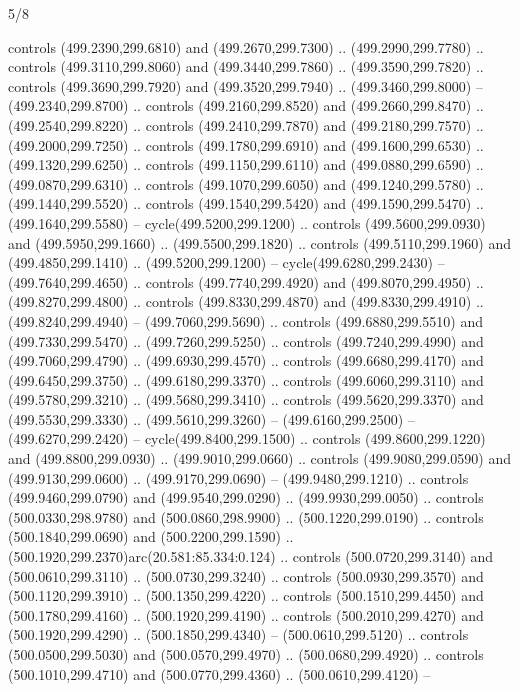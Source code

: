 \begin{flagdescription}{5/8}
\begin{scope}[xshift=0.5\flaglength,yshift=0.5\flagwidth,scale=\flagwidth/475.63]
\begin{scope}[y=0.8pt, x=0.8pt, yscale=-1, xscale=1,shift={(-450,-300)}]
\begin{scope}[cm={{1.0,0.0,0.0,1.0,(-0.0002,0.12556)}},cm={{1.0,0.0,0.0,1.0,(0.00179,0.0)}}]
\begin{scope}[cm={{1.11592,0.0,0.0,1.11592,(-106.89933,-41.77764)}}]
\begin{scope}[draw=black,fill=cfff]
\begin{scope}[fill=black]
  controls (499.2390,299.6810) and (499.2670,299.7300) .. (499.2990,299.7780) ..
  controls (499.3110,299.8060) and (499.3440,299.7860) .. (499.3590,299.7820) ..
  controls (499.3690,299.7920) and (499.3520,299.7940) .. (499.3460,299.8000) --
  (499.2340,299.8700) .. controls (499.2160,299.8520) and (499.2660,299.8470) ..
  (499.2540,299.8220) .. controls (499.2410,299.7870) and (499.2180,299.7570) ..
  (499.2000,299.7250) .. controls (499.1780,299.6910) and (499.1600,299.6530) ..
  (499.1320,299.6250) .. controls (499.1150,299.6110) and (499.0880,299.6590) ..
  (499.0870,299.6310) .. controls (499.1070,299.6050) and (499.1240,299.5780) ..
  (499.1440,299.5520) .. controls (499.1540,299.5420) and (499.1590,299.5470) ..
  (499.1640,299.5580) -- cycle(499.5200,299.1200) .. controls
  (499.5600,299.0930) and (499.5950,299.1660) .. (499.5500,299.1820) .. controls
  (499.5110,299.1960) and (499.4850,299.1410) .. (499.5200,299.1200) --
  cycle(499.6280,299.2430) -- (499.7640,299.4650) .. controls
  (499.7740,299.4920) and (499.8070,299.4950) .. (499.8270,299.4800) .. controls
  (499.8330,299.4870) and (499.8330,299.4910) .. (499.8240,299.4940) --
  (499.7060,299.5690) .. controls (499.6880,299.5510) and (499.7330,299.5470) ..
  (499.7260,299.5250) .. controls (499.7240,299.4990) and (499.7060,299.4790) ..
  (499.6930,299.4570) .. controls (499.6680,299.4170) and (499.6450,299.3750) ..
  (499.6180,299.3370) .. controls (499.6060,299.3110) and (499.5780,299.3210) ..
  (499.5680,299.3410) .. controls (499.5620,299.3370) and (499.5530,299.3330) ..
  (499.5610,299.3260) -- (499.6160,299.2500) -- (499.6270,299.2420) --
  cycle(499.8400,299.1500) .. controls (499.8600,299.1220) and
  (499.8800,299.0930) .. (499.9010,299.0660) .. controls (499.9080,299.0590) and
  (499.9130,299.0600) .. (499.9170,299.0690) -- (499.9480,299.1210) .. controls
  (499.9460,299.0790) and (499.9540,299.0290) .. (499.9930,299.0050) .. controls
  (500.0330,298.9780) and (500.0860,298.9900) .. (500.1220,299.0190) .. controls
  (500.1840,299.0690) and (500.2200,299.1590) ..
  (500.1920,299.2370)arc(20.581:85.334:0.124) .. controls (500.0720,299.3140)
  and (500.0610,299.3110) .. (500.0730,299.3240) .. controls (500.0930,299.3570)
  and (500.1120,299.3910) .. (500.1350,299.4220) .. controls (500.1510,299.4450)
  and (500.1780,299.4160) .. (500.1920,299.4190) .. controls (500.2010,299.4270)
  and (500.1920,299.4290) .. (500.1850,299.4340) -- (500.0610,299.5120) ..
  controls (500.0500,299.5030) and (500.0570,299.4970) .. (500.0680,299.4920) ..
  controls (500.1010,299.4710) and (500.0770,299.4360) .. (500.0610,299.4120) --

\end{scope}
\end{scope}
\end{scope}
\end{scope}
\end{scope}
\end{scope}
\end{flagdescription}
